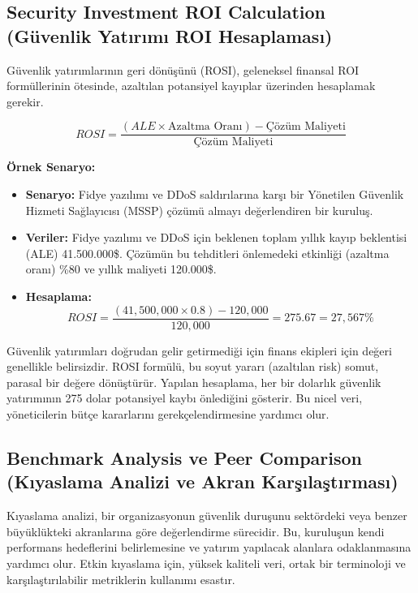 \subsection{Security Investment ROI Calculation (Güvenlik Yatırımı ROI Hesaplaması)}

Güvenlik yatırımlarının geri dönüşünü (ROSI), geleneksel finansal ROI formüllerinin ötesinde, azaltılan potansiyel kayıplar üzerinden hesaplamak gerekir.

\begin{equation}
ROSI = \frac{(ALE \times \text{Azaltma Oranı}) - \text{Çözüm Maliyeti}}{\text{Çözüm Maliyeti}}
\end{equation}

\textbf{Örnek Senaryo:}
\begin{itemize}
    \item \textbf{Senaryo:} Fidye yazılımı ve DDoS saldırılarına karşı bir Yönetilen Güvenlik Hizmeti Sağlayıcısı (MSSP) çözümü almayı değerlendiren bir kuruluş.
    \item \textbf{Veriler:} Fidye yazılımı ve DDoS için beklenen toplam yıllık kayıp beklentisi (ALE) 41.500.000\$. Çözümün bu tehditleri önlemedeki etkinliği (azaltma oranı) \%80 ve yıllık maliyeti 120.000\$.
    \item \textbf{Hesaplama:}
    \begin{equation*}
    ROSI = \frac{(41,500,000 \times 0.8) - 120,000}{120,000} = 275.67 = 27,567\%
    \end{equation*}
\end{itemize}

Güvenlik yatırımları doğrudan gelir getirmediği için finans ekipleri için değeri genellikle belirsizdir. ROSI formülü, bu soyut yararı (azaltılan risk) somut, parasal bir değere dönüştürür. Yapılan hesaplama, her bir dolarlık güvenlik yatırımının 275 dolar potansiyel kaybı önlediğini gösterir. Bu nicel veri, yöneticilerin bütçe kararlarını gerekçelendirmesine yardımcı olur.

\subsection{Benchmark Analysis ve Peer Comparison (Kıyaslama Analizi ve Akran Karşılaştırması)}

Kıyaslama analizi, bir organizasyonun güvenlik duruşunu sektördeki veya benzer büyüklükteki akranlarına göre değerlendirme sürecidir. Bu, kuruluşun kendi performans hedeflerini belirlemesine ve yatırım yapılacak alanlara odaklanmasına yardımcı olur. Etkin kıyaslama için, yüksek kaliteli veri, ortak bir terminoloji ve karşılaştırılabilir metriklerin kullanımı esastır.

